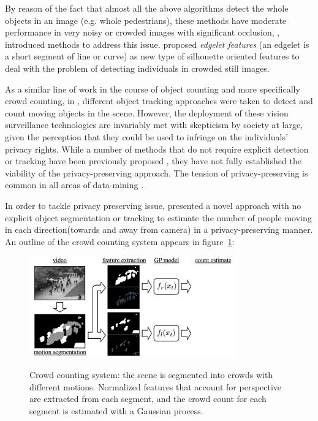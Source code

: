 By reason of the fact that almost all the above algorithms detect the whole objects in an image (e.g. whole pedestrians), these methods have moderate performance in very noisy or crowded images with significant occlusion, \citealt*{wu2005detection, lin2001estimation}, introduced methods to address this issue. \citealt*{wu2005detection} proposed \textit{edgelet features} (an edgelet is a short segment of line or curve) as new type of silhouette oriented features to deal with the problem of detecting individuals in crowded still images. %

\indent As a similar line of work in the course of object counting and more specifically crowd counting, in \cite{rabaud2006counting, brostow2006unsupervised, leibe2007coupled}, different object tracking approaches were taken to detect and count moving objects in the scene. However, the deployment of these vision surveillance technologies are invariably met with skepticism by society at large, given the perception that they could be used to infringe on the individuals' privacy rights. While a number of methods that do not require explicit detection or tracking have been previously proposed \cite{paragios2001mrf, cho1999neural, regazzoni1996distributed, davies1995crowd, kong2005counting, marana1998efficacy, dong2007fast}, they have not fully established the viability of the privacy-preserving approach\cite{chan2008privacy}. The tension of privacy-preserving is common in all areas of data-mining \cite{vaidya2006privacy, verykios2004state}. 

In order to tackle privacy preserving issue, \citealt*{chan2008privacy} presented a novel approach with no explicit object segmentation or tracking to estimate the number of people moving in each direction(towards and away from camera) in a privacy-preserving manner. An outline of the crowd counting system appears in figure~\ref{fig:ucsd}:
\begin{figure}[H]
	\centering
	{\includegraphics[width=0.8\textwidth]{images/ucsdOutline}}
	\caption{Crowd counting system: the scene is segmented into crowds with different motions. Normalized features that account for perspective are extracted from each segment, and the crowd count for each segment is estimated with a Gaussian process\cite{chan2008privacy}.}
	\label{fig:ucsd}
\end{figure}

